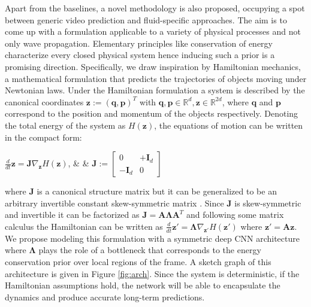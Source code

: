 \documentclass[a4paper,11pt]{article}
\begin{document}
Apart from the baselines, a novel methodology is also proposed, occupying a spot between generic video prediction and fluid-specific approaches. The aim is to come up with a formulation applicable to a variety of physical processes and not only wave propagation. Elementary principles like conservation of energy characterize every closed physical system hence inducing such a prior is a promising direction. Specifically, we draw inspiration by Hamiltonian mechanics, a mathematical formulation that predicts the trajectories of objects moving under Newtonian laws. Under the Hamiltonian formulation a system is described by the canonical coordinates $\mathbf{z} :=(\mathbf{q}, \mathbf{p})^{T}$ with $  \mathbf{q}, \mathbf{p} \in \mathbb{R}^{d}, \mathbf{z} \in \mathbb{R}^{2 d}$, where $\mathbf{q}$ and $\mathbf{p}$ correspond to the position and momentum of the objects respectively. Denoting the total energy of the system as $H(\mathbf{z})$, the equations of motion can be written in the compact form:

\begin{center}

\begin{tabularx}{\textwidth}
\vskip -7pt
$\frac{d}{d t} \mathbf{z}= \mathbf{J} \nabla_{\mathbf{z}} H(\mathbf{z})$,
    &  & 
$\mathbf{J} :=\left[ \begin{array}{cc}{0} & {+\mathbf{I}_{d}} \\ {-\mathbf{I}_{d}} & {0}\end{array}\right]$
\end{tabularx}
\end{center}
\vskip -4pt

where $\mathbf{J}$ is a canonical structure matrix but it can be generalized to be an arbitrary invertible constant skew-symmetric matrix \cite{leimkuhler_reich_2005hamiltonian}. Since $\mathbf{J}$ is skew-symmetric and invertible it can be factorized as $\mathbf{J} = \mathbf{A\Lambda A}^T$ and following some matrix calculus the Hamiltonian can be written as $\frac{d}{d t} \mathbf{z'}= \mathbf{\Lambda} \nabla_{\mathbf{z'}} H(\mathbf{z'})$ where $\mathbf{z'} = \mathbf{Az}$. We propose modeling this formulation with a symmetric deep CNN architecture where $\mathbf{\Lambda}$ plays the role of a bottleneck that corresponds to the energy conservation prior over local regions of the frame. 
A sketch graph of this architecture is given in Figure \ref{fig:arch}. Since the system is deterministic, if the Hamiltonian assumptions hold, the network will be able to encapsulate the dynamics and produce accurate long-term predictions.
\end{document}
